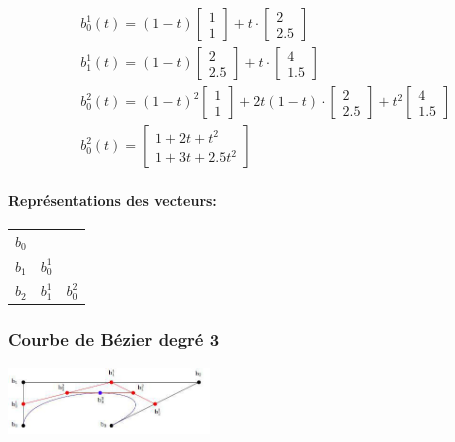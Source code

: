 \documentclass[a4paper,9pt]{extarticle}
\begin{document}
\begin{multicols*}{2}
\begin{align*}
& b_0^1(t) = (1-t)\begin{bmatrix}1\\1\end{bmatrix} + t\cdot \begin{bmatrix}2\\2.5\end{bmatrix}\\
& b_1^1(t) = (1-t)\begin{bmatrix}2\\2.5\end{bmatrix} + t\cdot \begin{bmatrix}4\\1.5\end{bmatrix}\\
& b_0^2(t) = (1-t)^2\begin{bmatrix}1\\1\end{bmatrix} + 2t(1-t)\cdot \begin{bmatrix}2\\2.5\end{bmatrix} + t^2\begin{bmatrix}4\\1.5\end{bmatrix}\\
& b_0^2(t) = 
\begin{bmatrix}
1+2t+t^2\\
1+3t+2.5t^2
\end{bmatrix}
\end{align*}

\paragraph*{Représentations des vecteurs:}
\begin{tabular}{lll}
$b_0$ &         &         \\
$b_1$ & $b_0^1$ &         \\
$b_2$ & $b_1^1$ & $b_0^2$
\end{tabular}
\subsubsection{Courbe de Bézier degré 3}

\includegraphics[width=0.4\textwidth]{img/bezier_2.jpg}


\end{multicols*}
\end{document}
